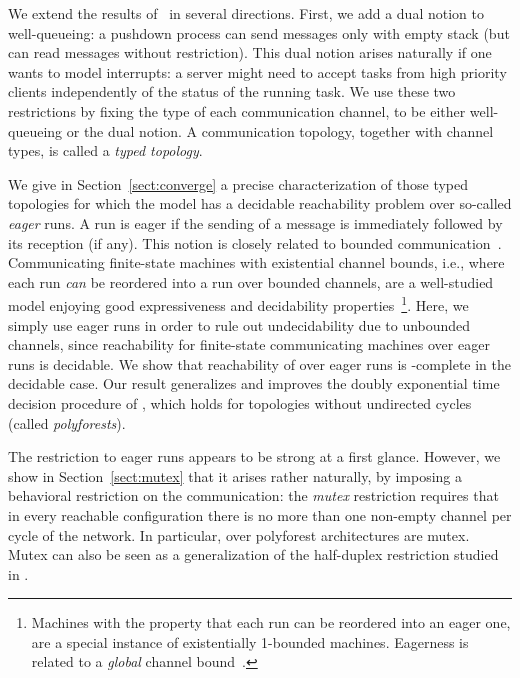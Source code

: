 \documentclass{LMCS}
\begin{document}
We extend the results
of~\cite{latorre-s-2008-299-a} in several directions. First, we add a
dual notion to well-queueing: a pushdown process can send messages
only with empty stack (but can read messages without
restriction). This dual notion arises naturally if one wants to model
interrupts: a server might need to accept tasks from high priority
clients independently of the status of the running task. We use these two
restrictions  by fixing the type of each communication channel, to be either
well-queueing or the dual notion. A communication topology, together
with channel types, is called a \emph{typed topology}.


We give in Section~\ref{sect:converge} a precise characterization of those
typed topologies for which the \rqcp model has a
decidable reachability problem over so-called
\emph{eager} runs. A run is eager if the
sending of a message is immediately followed by its
reception (if any). This notion is closely related to 
bounded communication~\cite{lohrey-m-2004-160-a}. 
Communicating finite-state machines with existential channel bounds,
i.e., where each run \emph{can} be
reordered into a run over bounded channels, are a
well-studied model enjoying good expressiveness and
decidability properties~\cite{genest-b-2006-920-a}\footnote{Machines with the
property that  each run can be reordered into an eager
one, are a special instance of existentially 1-bounded
machines. Eagerness is related 
to a \emph{global} channel bound~\cite{lohrey-m-2004-160-a}.}.
Here, we
simply use  eager runs in order to rule out undecidability
due to unbounded channels, since reachability for finite-state
communicating machines over eager runs is decidable. We show that reachability
of \rqcp over eager runs is \dexptime-complete in the
decidable case. Our result generalizes and improves the
doubly exponential time decision procedure of
\cite{latorre-s-2008-299-a}, which holds for topologies without undirected
cycles (called \emph{polyforests}).



The restriction to eager runs appears to be strong at a first glance.
However, we show in Section~\ref{sect:mutex} that it arises rather
naturally, by imposing a behavioral restriction on the communication:
the \emph{mutex} restriction requires that in every reachable
configuration there is no more than one non-empty channel per cycle of
the network. In particular, \rqcp over polyforest architectures are
mutex. Mutex can also be  seen as a generalization of the half-duplex
restriction studied in \cite{cece-g-1997-304-a}.
\end{document}
